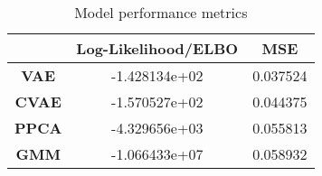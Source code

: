 \begin{table}
\centering
\caption{Model performance metrics}
\label{table:metrics}
\begin{tabular}{ccc}
\toprule
{} &  \textbf{Log-Likelihood/ELBO} &  \textbf{MSE} \\
\midrule
\textbf{VAE } &                 -1.428134e+02 &      0.037524 \\
\textbf{CVAE} &                 -1.570527e+02 &      0.044375 \\
\textbf{PPCA} &                 -4.329656e+03 &      0.055813 \\
\textbf{GMM } &                 -1.066433e+07 &      0.058932 \\
\bottomrule
\end{tabular}
\end{table}
